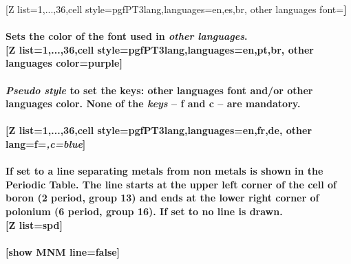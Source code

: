 [Z list={1,...,36},cell style=pgfPT3lang,languages={en,es,br}, other languages font=\string\tiny\string\bfseries]%
\\ [10pt]\makebox[\linewidth][c]{\scalebox{.6}{\pgfPT[Z list={1,...,36},cell style=pgfPT3lang,languages={en,es,br},other languages font=\tiny\bfseries]}}%
\\ [0pt]\pgfPTendoption%
\label{option_other languages color}%
%
{Sets the color of the font used in \textit{other languages}.}%
\\ [5pt][Z list={1,...,36},cell style=pgfPT3lang,languages={en,pt,br}, other languages color=purple]%
\\ [10pt]\makebox[\linewidth][c]{\scalebox{.6}{\pgfPT[Z list={1,...,36},cell style=pgfPT3lang,languages={en,pt,br}, other languages color=purple]}}%
\\ [0pt]\pgfPTendoption%
\label{style_other lang}%
%
{\textit{Pseudo style} to set the keys: other languages \textbf{f}ont and/or other languages \textbf{c}olor. %
None of the \textit{keys} -- f and c -- are mandatory.
\\ [3pt]%
}%
\\ [5pt][Z list={1,...,36},cell style=pgfPT3lang,languages={en,fr,de}, other lang={f=\string\tiny\string\itshape,c=blue}]%
\\ [10pt]\makebox[\linewidth][c]{\scalebox{.6}{\pgfPT[Z list={1,...,36},cell style=pgfPT3lang,languages={en,fr,de}, other lang={f=\tiny\itshape,c=blue}]}}%
\\ [0pt]\pgfPTendstyle%
\label{option_show MNM line}%
%
{If set to  a line separating metals from non metals is shown in the Periodic Table. The line starts at the upper left corner of the cell of boron (2 period, group 13) and ends at the lower right corner of polonium (6 period, group 16). If set to  no line is drawn.
}%
\\ [5pt][Z list=spd]%
\\ [10pt]\makebox[\linewidth][c]{\scalebox{.6}{\pgfPT[Z list=spd]}}%
\\ [10pt][show MNM line=false]%
\\ [10pt]\makebox[\linewidth][c]{\scalebox{.6}{\pgfPT[show MNM line=false]}}%

